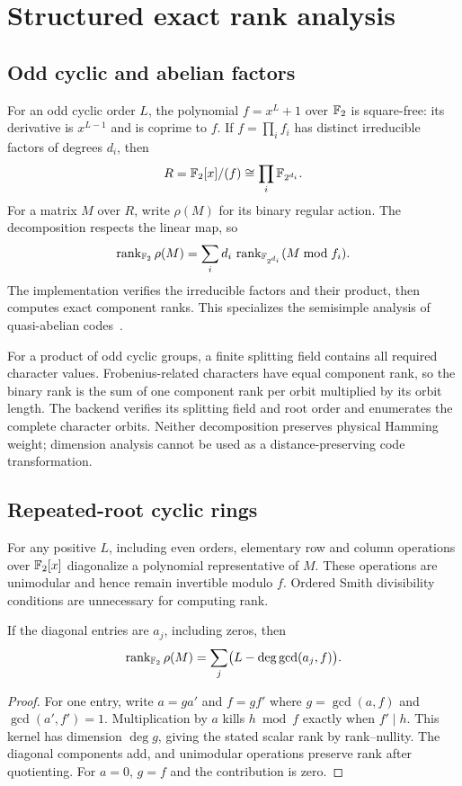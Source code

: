 \section{Structured exact rank analysis}

\subsection{Odd cyclic and abelian factors}
For an odd cyclic order $L$, the polynomial $f=x^L+1$ over $\mathbb{F}_2$ is
square-free: its derivative is $x^{L-1}$ and is coprime to $f$. If
$f=\prod_i f_i$ has distinct irreducible factors of degrees $d_i$, then
\begin{equation}
 R=\mathbb{F}_2[x]/(f)\cong\prod_i \mathbb F_{2^{d_i}}.
\end{equation}
For a matrix $M$ over $R$, write $\rho(M)$ for its binary regular action.
The decomposition respects the linear map, so
\begin{equation}
 \operatorname{rank}_{\mathbb{F}_2}\rho(M)=\sum_i d_i\,
 \operatorname{rank}_{\mathbb F_{2^{d_i}}}(M\bmod f_i).
\end{equation}
The implementation verifies the irreducible factors and their product,
then computes exact component ranks. This specializes the semisimple
analysis of quasi-abelian codes~\cite[Appendices A--B]{panteleev2021}.

For a product of odd cyclic groups, a finite splitting field contains all
required character values. Frobenius-related characters have equal
component rank, so the binary rank is the sum of one component rank per
orbit multiplied by its orbit length. The backend verifies its splitting
field and root order and enumerates the complete character orbits.
Neither decomposition preserves physical Hamming weight; dimension
analysis cannot be used as a distance-preserving code transformation.

\subsection{Repeated-root cyclic rings}
For any positive $L$, including even orders, elementary row and column
operations over $\mathbb{F}_2[x]$ diagonalize a polynomial representative of $M$.
These operations are unimodular and hence remain invertible modulo $f$.
Ordered Smith divisibility conditions are unnecessary for computing rank.

\begin{proposition}
If the diagonal entries are $a_j$, including zeros, then
\begin{equation}
 \operatorname{rank}_{\mathbb{F}_2}\rho(M)=\sum_j\bigl(L-\deg\gcd(a_j,f)\bigr).
\end{equation}
\end{proposition}
\begin{proof}
For one entry, write $a=ga'$ and $f=gf'$ where $g=\gcd(a,f)$ and
$\gcd(a',f')=1$. Multiplication by $a$ kills $h\bmod f$ exactly when
$f'\mid h$. This kernel has dimension $\deg g$, giving the stated scalar
rank by rank--nullity. The diagonal components add, and unimodular
operations preserve rank after quotienting. For $a=0$, $g=f$ and the
contribution is zero.
\end{proof}

